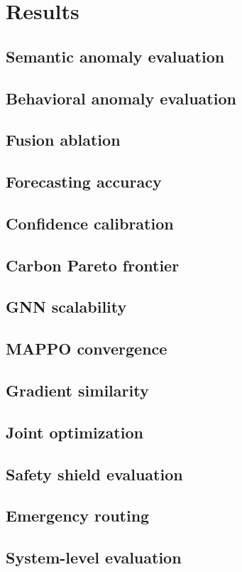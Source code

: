 \section{Results}
\subsection{Semantic anomaly evaluation}
\subsection{Behavioral anomaly evaluation}
\subsection{Fusion ablation}
\subsection{Forecasting accuracy}
\subsection{Confidence calibration}
\subsection{Carbon Pareto frontier}
\subsection{GNN scalability}
\subsection{MAPPO convergence}
\subsection{Gradient similarity}
\subsection{Joint optimization}
\subsection{Safety shield evaluation}
\subsection{Emergency routing}
\subsection{System-level evaluation}
